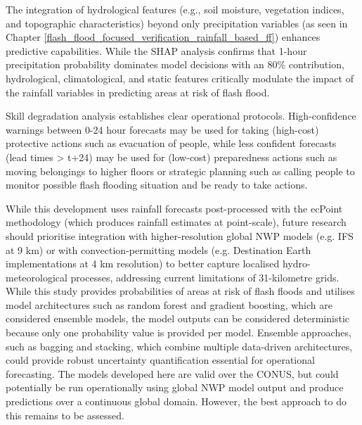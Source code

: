 \documentclass[nhess, manuscript]{copernicus}
\begin{document}
The integration of hydrological features (e.g., soil moisture, vegetation indices, and topographic characteristics) beyond only precipitation variables (as seen in Chapter \ref{flash_flood_focused_verification_rainfall_based_ff}) enhances predictive capabilities. While the SHAP analysis confirms that 1-hour precipitation probability dominates model decisions with an 80\% contribution, hydrological, climatological, and static features critically modulate the impact of the rainfall variables in predicting areas at risk of flash flood.

Skill degradation analysis establishes clear operational protocols. High-confidence warnings between 0-24 hour forecasts may be used for taking (high-cost) protective actions such as evacuation of people, while less confident forecasts (lead times > t+24) may be used for (low-cost) preparedness actions such as moving belongings to higher floors or strategic planning such as calling people to monitor possible flash flooding situation and be ready to take actions. 

While this development uses rainfall forecasts post-processed with the ecPoint methodology (which produces rainfall estimates at point-scale), future research should prioritise integration with higher-resolution global NWP models (e.g. IFS at 9 km) or with convection-permitting models (e.g. Destination Earth implementations at 4 km resolution) to better capture localised hydro-meteorological processes, addressing current limitations of 31-kilometre grids. While this study provides probabilities of areas at risk of flash floods and utilises model architectures such as random forest and gradient boosting, which are considered ensemble models, the model outputs can be considered deterministic because only one probability value is provided per model. Ensemble approaches, such as bagging and stacking, which combine multiple data-driven architectures, could provide robust uncertainty quantification essential for operational forecasting. The models developed here are valid over the CONUS, but could potentially be run operationally using global NWP model output and produce predictions over a continuous global domain. However, the best approach to do this remains to be assessed.



\end{document}
